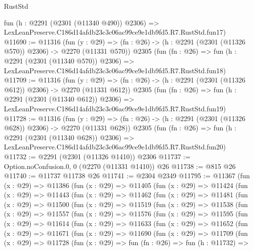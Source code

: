 \begin{lexlean}{RustStd}
\begin{coremodule}
    fun (h : @2291 (@2301 (@11340 @490)) @2306) =>
    LexLeanPreserve.C186d14afdb23c3c06ac99ce9e1db9fd5.R7.RustStd.fun17)
@11690 := @11316
    (fun (y : @29) => (fn : @26) -> (h : @2291 (@2301 (@11326 @570)) @2306) -> @2270 (@11331 @570))
    @2305
    (fun (fn : @26) =>
    fun (h : @2291 (@2301 (@11340 @570)) @2306) =>
    LexLeanPreserve.C186d14afdb23c3c06ac99ce9e1db9fd5.R7.RustStd.fun18)
@11709 := @11316
    (fun (y : @29) => (fn : @26) -> (h : @2291 (@2301 (@11326 @612)) @2306) -> @2270 (@11331 @612))
    @2305
    (fun (fn : @26) =>
    fun (h : @2291 (@2301 (@11340 @612)) @2306) =>
    LexLeanPreserve.C186d14afdb23c3c06ac99ce9e1db9fd5.R7.RustStd.fun19)
@11728 := @11316
    (fun (y : @29) => (fn : @26) -> (h : @2291 (@2301 (@11326 @628)) @2306) -> @2270 (@11331 @628))
    @2305
    (fun (fn : @26) =>
    fun (h : @2291 (@2301 (@11340 @628)) @2306) =>
    LexLeanPreserve.C186d14afdb23c3c06ac99ce9e1db9fd5.R7.RustStd.fun20)
@11732 := @2291 (@2301 (@11326 @1410)) @2306
@11737 := Option.noConfusion.{0, 0} (@2270 (@11331 @1410)) @26
@11738 := @815 @26
@11740 := @11737 @11738 @26
@11741 := @2304 @2349
@11795 := @11367
    (fun (x : @29) =>
    @11386
      (fun (x : @29) =>
      @11405
        (fun (x : @29) =>
        @11424
          (fun (x : @29) =>
          @11443
            (fun (x : @29) =>
            @11462
              (fun (x : @29) =>
              @11481
                (fun (x : @29) =>
                @11500
                  (fun (x : @29) =>
                  @11519
                    (fun (x : @29) =>
                    @11538
                      (fun (x : @29) =>
                      @11557
                        (fun (x : @29) =>
                        @11576
                          (fun (x : @29) =>
                          @11595
                            (fun (x : @29) =>
                            @11614
                              (fun (x : @29) =>
                              @11633
                                (fun (x : @29) =>
                                @11652
                                  (fun (x : @29) =>
                                  @11671
                                    (fun (x : @29) =>
                                    @11690
                                      (fun (x : @29) =>
                                      @11709
                                        (fun (x : @29) =>
                                        @11728
                                          (fun (x : @29) =>
                                          fun (fn : @26) =>
                                          fun (h : @11732) =>

\end{coremodule}
\end{lexlean}
